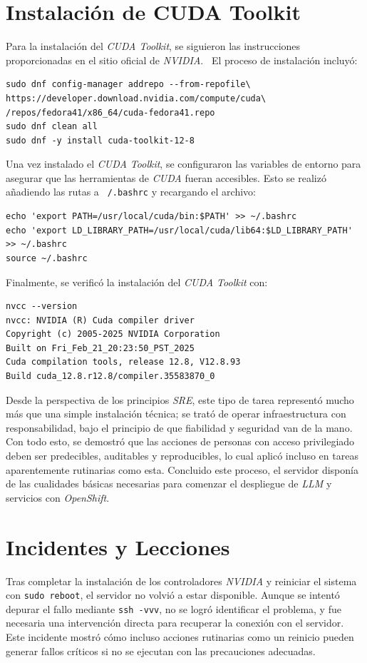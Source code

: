\section{Instalación de CUDA Toolkit}
Para la instalación del \textit{CUDA Toolkit}, se siguieron las instrucciones proporcionadas en el sitio oficial de \textit{NVIDIA}.~\cite{ref24} El proceso de instalación incluyó:
\begin{verbatim}
sudo dnf config-manager addrepo --from-repofile\ 
https://developer.download.nvidia.com/compute/cuda\
/repos/fedora41/x86_64/cuda-fedora41.repo
sudo dnf clean all
sudo dnf -y install cuda-toolkit-12-8
\end{verbatim}

Una vez instalado el \textit{CUDA Toolkit}, se configuraron las variables de entorno para asegurar que las herramientas de \textit{CUDA} fueran accesibles. Esto se realizó añadiendo las rutas a \texttt{~/.bashrc} y recargando el archivo:
\begin{verbatim}
echo 'export PATH=/usr/local/cuda/bin:$PATH' >> ~/.bashrc
echo 'export LD_LIBRARY_PATH=/usr/local/cuda/lib64:$LD_LIBRARY_PATH' >> ~/.bashrc
source ~/.bashrc
\end{verbatim}

Finalmente, se verificó la instalación del \textit{CUDA Toolkit} con:
\begin{verbatim}
nvcc --version
nvcc: NVIDIA (R) Cuda compiler driver
Copyright (c) 2005-2025 NVIDIA Corporation
Built on Fri_Feb_21_20:23:50_PST_2025
Cuda compilation tools, release 12.8, V12.8.93
Build cuda_12.8.r12.8/compiler.35583870_0
\end{verbatim}

Desde la perspectiva de los principios \textit{SRE}, este tipo de tarea representó mucho más que una simple instalación técnica; se trató de operar infraestructura con responsabilidad, bajo el principio de que fiabilidad y seguridad van de la mano. Con todo esto, se demostró que las acciones de personas con acceso privilegiado deben ser predecibles, auditables y reproducibles, lo cual aplicó incluso en tareas aparentemente rutinarias como esta. Concluido este proceso, el servidor disponía de las cualidades básicas necesarias para comenzar el despliegue de \textit{LLM} y servicios con \textit{OpenShift}.

\newpage
\section{Incidentes y Lecciones}
Tras completar la instalación de los controladores \textit{NVIDIA} y reiniciar el sistema con \texttt{sudo reboot}, el servidor no volvió a estar disponible. Aunque se intentó depurar el fallo mediante \texttt{ssh -vvv}, no se logró identificar el problema, y fue necesaria una intervención directa para recuperar la conexión con el servidor. Este incidente mostró cómo incluso acciones rutinarias como un reinicio pueden generar fallos críticos si no se ejecutan con las precauciones adecuadas.

